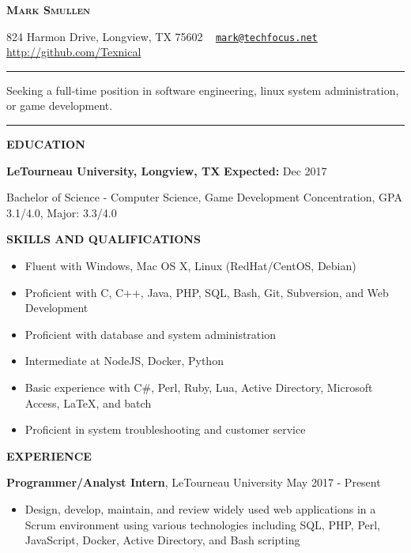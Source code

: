 \documentclass[letterpaper]{article}
\newcommand{\titlename}[1]{\centerline{\huge \bfseries{\scshape{#1}}}}
\newcommand{\contactinfo}[1]{\centerline{\small #1}}
\renewcommand{\section}[1]{\bigskip\noindent\textbf{#1}\smallskip}
\newcommand{\entry}[3]{\textbf{#1}, #2\begin{itemize}[leftmargin=3.5em]#3\end{itemize}\bigskip}
\begin{document}
\titlename{Mark Smullen}
\contactinfo{%
    824 Harmon Drive, Longview, TX 75602 \textperiodcentered \ %
    \href{mailto:mark@techfocus.net}{\nolinkurl{mark@techfocus.net}} \textperiodcentered \ %
    \url{http://github.com/Texnical} \textperiodcentered \ %
    \phonenumber[country=US]{2707911770}%
}
\vspace{2mm}
\hrule
\vspace{2mm}
\centerline{Seeking a full-time position in software engineering, linux system administration, or game development.}
\vspace{2mm}
\hrule

\section{EDUCATION}

\textbf{LeTourneau University, Longview, TX}                            \hfill          \textbf{Expected:} Dec 2017

Bachelor of Science - Computer Science, Game Development Concentration, GPA 3.1/4.0, Major: 3.3/4.0


\section{SKILLS AND QUALIFICATIONS}

\begin{multicols}{2}
\begin{itemize}[leftmargin=3.5em]
    \item Fluent with Windows, Mac OS X, Linux (RedHat/CentOS, Debian)
    \item Proficient with C, C++, Java, PHP, SQL, Bash, Git, Subversion, and Web Development
    \item Proficient with database and system administration
    \item Intermediate at NodeJS, Docker, Python
    \item Basic experience with C\#, Perl, Ruby, Lua, Active Directory, Microsoft Access, \LaTeX{}, and batch
    \item Proficient in system troubleshooting and customer service
\end{itemize}
\end{multicols}

\section{EXPERIENCE}

\entry{Programmer/Analyst Intern}{LeTourneau University                 \hfill          May 2017 - Present} {
    \item Design, develop, maintain, and review widely used web applications in a Scrum environment using various technologies including SQL, PHP, Perl, JavaScript, Docker, Active Directory, and Bash scripting
}
\end{document}
